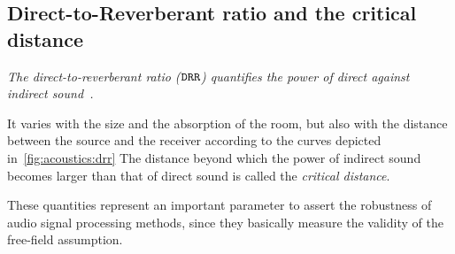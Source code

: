 \subsection{Direct-to-Reverberant ratio and the critical distance}\label{ch:acoustics:subsec:drr}
\begin{center}
    \textit{The \emph{direct-to-reverberant ratio} ($\mathtt{DRR}$) quantifies the power of direct against indirect sound~.}
\end{center}
It varies with the size and the absorption of the room, but also with the distance between the source and the receiver according to the curves
depicted in~\cref{fig:acoustics:drr}
The distance beyond which the power of indirect sound becomes larger than that of direct sound is called the \textit{critical distance}.

These quantities represent an important parameter to assert the robustness of audio signal processing methods,
since they basically measure the validity of the free-field assumption.

